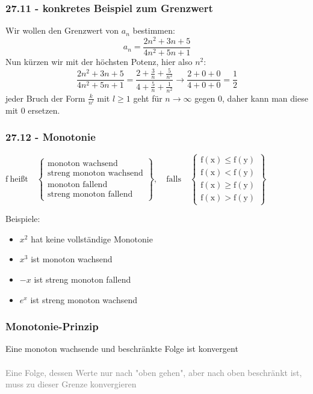 \documentclass{report}
\begin{document}
		\subsubsection{27.11 - konkretes Beispiel zum Grenzwert}
			Wir wollen den Grenzwert von $a_n$ bestimmen: 
			\begin{equation*}
				a_n = \frac{2n^2 + 3n + 5}{4n^2+5n+1}
			\end{equation*}
			Nun kürzen wir mit der höchsten Potenz, hier also $n^2$:
			\begin{equation*}
				\frac{2n^2 + 3n + 5}{4n^2+5n+1} = \frac{2 +\frac3n + \frac5{n^2}}{4 + \frac5n + \frac1{n^2}} \rightarrow \frac{2 + 0 + 0}{4 + 0 + 0} = \frac12
			\end{equation*}
			jeder Bruch der Form $\frac{k}{n^l}$ mit $l\geq 1$ geht für $n \to \infty$ gegen 0, daher kann man diese mit 0 ersetzen.
		\subsubsection{27.12 - Monotonie}
			 \begin{center}
			 	$\mathrm{f~heißt}\quad
			 	\begin{Bmatrix}
			 		\text{monoton wachsend} \\
			 		\text{streng monoton wachsend} \\
			 		\text{monoton fallend} \\
			 		\text{streng monoton fallend}
			 	\end{Bmatrix},\quad\mathrm{falls}\quad
			 	\begin{Bmatrix}
			 		\mathrm{f(x)\leqslant f(y)} \\
			 		\mathrm{f(x)<f(y)} \\
			 		\mathrm{f(x)\geqslant f(y)} \\
			 		\mathrm{f(x)>f(y)}
			 	\end{Bmatrix}$
			 \end{center}
			 Beispiele:
			 \begin{itemize}
			 	\item $x^2$ hat keine vollständige Monotonie
			 	\item $x^3$ ist monoton wachsend
			 	\item $-x$ ist streng monoton fallend
			 	\item $e^x$ ist streng monoton wachsend
			 \end{itemize}
		\subsubsection{Monotonie-Prinzip}
			Eine monoton wachsende und beschränkte Folge ist konvergent\\
			\\
			\textcolor{gray}{Eine Folge, dessen Werte nur nach "oben gehen", aber nach oben beschränkt ist, muss zu dieser Grenze konvergieren}
\end{document}
